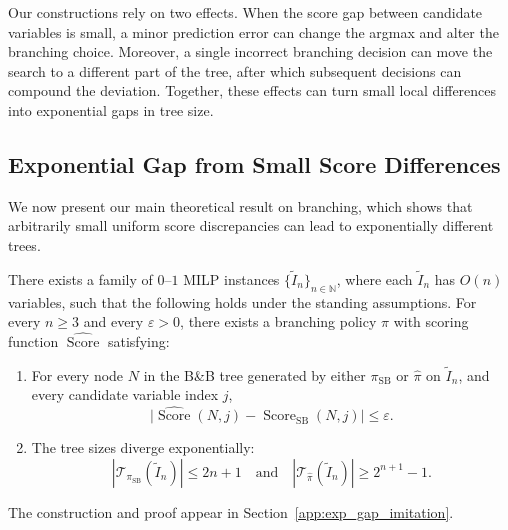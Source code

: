 \documentclass[smallextended,envcountsect]{svjour3} %
\newcommand{\N}{\mathbb{N}}
\newcommand{\Tcal}{\mathcal{T}}
\newcommand{\0}{\mathbf{0}}
\DeclareMathOperator{\Score}{Score} %
\newcommand{\1}{\mathbf{1}} %
\begin{document}


Our constructions rely on two effects. When the score gap between candidate variables is small, a minor prediction error can change the argmax and alter the branching choice. Moreover, a single incorrect branching decision can move the search to a different part of the tree, after which subsequent decisions can compound the deviation. Together, these effects can turn small local differences into exponential gaps in tree size.


\subsection{Exponential Gap from Small Score Differences}

We now present our main theoretical result on branching, which shows that arbitrarily small uniform score discrepancies can lead to exponentially different trees.

\begin{theorem}\label{thm:exp_gap_imitation}
	There exists a family of $0$--$1$ MILP instances $\{\widetilde I_n\}_{n \in \N}$, where each $\widetilde I_n$ has $O(n)$ variables, such that the following holds under the standing assumptions.
	For every $n\ge 3$ and every $\varepsilon>0$, there exists a branching policy $\hat\pi$ with scoring function $\widehat{\Score}$ satisfying:
	\begin{enumerate}
		\item For every node $N$ in the B\&B tree generated by either $\pi_{\mathrm{SB}}$ or $\hat\pi$ on $\widetilde I_n$, and every candidate variable index $j$,
		      \[
		      \bigl|\widehat{\Score}(N,j) - \Score_{\mathrm{SB}}(N,j)\bigr| \le \varepsilon.
		      \]
		\item The tree sizes diverge exponentially:
		      \[
			      |\Tcal_{\pi_{\mathrm{SB}}}(\widetilde I_n)| \le 2n+1
			      \quad\text{and}\quad
			      |\Tcal_{\hat\pi}(\widetilde I_n)| \ge 2^{n+1}-1.
		      \]
	\end{enumerate}
\end{theorem}
The construction and proof appear in Section~\ref{app:exp_gap_imitation}.
\end{document}
